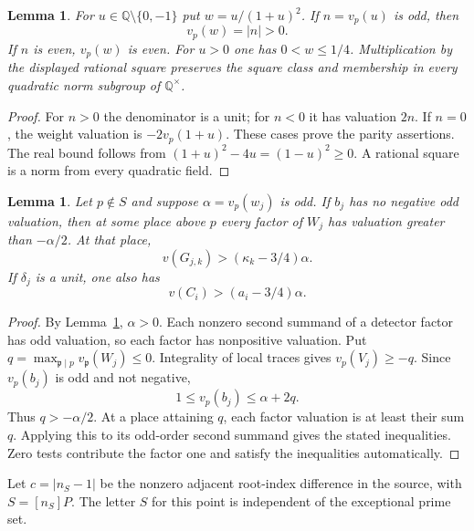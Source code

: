 \documentclass[11pt,a4paper]{article}
\newtheorem{lemma}[theorem]{Lemma}
\newcommand{\Q}{\mathbb Q}\newcommand{\Z}{\mathbb Z}
\begin{document}
\begin{lemma}\label{lem:weight}
For $u\in\Q\setminus\{0,-1\}$ put $w=u/(1+u)^2$. If
$n=v_p(u)$ is odd, then
\[
                              v_p(w)=|n|>0.
\]
If $n$ is even, $v_p(w)$ is even. For $u>0$ one has
$0<w\le1/4$. Multiplication by the displayed rational square
preserves the square class and membership in every quadratic norm
subgroup of $\Q^\times$.
\end{lemma}
\begin{proof}
For $n>0$ the denominator is a unit; for $n<0$ it has valuation
$2n$. If $n=0$, the weight valuation is $-2v_p(1+u)$.
These cases prove the parity assertions. The real bound follows
from $(1+u)^2-4u=(1-u)^2\ge0$. A rational square is a norm
from every quadratic field.
\end{proof}

\begin{lemma}\label{lem:trace}
Let $p\notin S$ and suppose $\alpha=v_p(w_j)$ is odd. If $b_j$
has no negative odd valuation, then at some place above $p$ every
factor of $W_j$ has valuation greater than $-\alpha/2$. At that place,
\[
                 v(G_{j,k})>(\kappa_k-3/4)\alpha.
\]
If $\delta_j$ is a unit, one also has
\[
                         v(C_i)>(a_i-3/4)\alpha.
\]
\end{lemma}
\begin{proof}
By Lemma~\ref{lem:weight}, $\alpha>0$. Each nonzero second
summand of a detector factor has odd valuation, so each factor has
nonpositive valuation. Put
$q=\max_{\mathfrak p\mid p}v_{\mathfrak p}(W_j)\le0$.
Integrality of local traces gives $v_p(V_j)\ge-q$.
Since $v_p(b_j)$ is odd and not negative,
\[
                        1\le v_p(b_j)\le\alpha+2q.
\]
Thus $q>-\alpha/2$. At a place attaining $q$, each factor
valuation is at least their sum $q$. Applying this to its odd-order
second summand gives the stated inequalities. Zero tests contribute
the factor one and satisfy the inequalities automatically.
\end{proof}

Let $c=|n_S-1|$ be the nonzero adjacent root-index difference in the
source, with $S=[n_S]P$. The letter $S$ for this point is independent
of the exceptional prime set.
\end{document}
